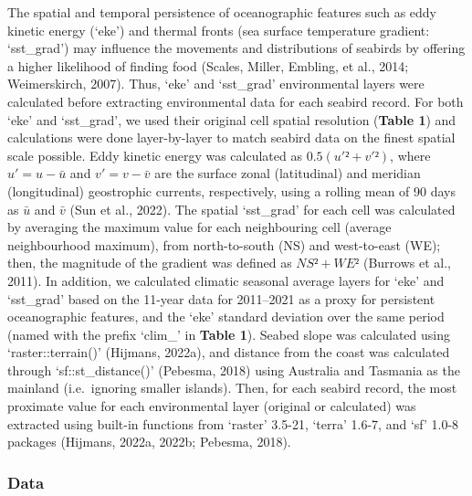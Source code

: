 \documentclass{article}
\begin{document}
The spatial and temporal persistence of oceanographic features such as
eddy kinetic energy (`eke') and thermal fronts (sea surface temperature
gradient: `sst\_grad') may influence the movements and distributions of
seabirds by offering a higher likelihood of finding food (Scales,
Miller, Embling, et al., 2014; Weimerskirch, 2007). Thus, `eke' and
`sst\_grad' environmental layers were calculated before extracting
environmental data for each seabird record. For both `eke' and
`sst\_grad', we used their original cell spatial resolution
(\textbf{Table 1}) and calculations were done layer-by-layer to match
seabird data on the finest spatial scale possible. Eddy kinetic energy
was calculated as \(0.5 (u'² + v'²)\), where \(u' = u - \bar{u}\) and
\(v' = v - \bar{v}\) are the surface zonal (latitudinal) and meridian
(longitudinal) geostrophic currents, respectively, using a rolling mean
of 90 days as \(\bar{u}\) and \(\bar{v}\) (Sun et al., 2022). The
spatial `sst\_grad' for each cell was calculated by averaging the
maximum value for each neighbouring cell (average neighbourhood
maximum), from north-to-south (NS) and west-to-east (WE); then, the
magnitude of the gradient was defined as \(NS² + WE²\) (Burrows et al.,
2011). In addition, we calculated climatic seasonal average layers for
`eke' and `sst\_grad' based on the 11-year data for 2011--2021 as a
proxy for persistent oceanographic features, and the `eke' standard
deviation over the same period (named with the prefix `clim\_' in
\textbf{Table 1}). Seabed slope was calculated using `raster::terrain()'
(Hijmans, 2022a), and distance from the coast was calculated through
`sf::st\_distance()' (Pebesma, 2018) using Australia and Tasmania as the
mainland (i.e.~ignoring smaller islands). Then, for each seabird record,
the most proximate value for each environmental layer (original or
calculated) was extracted using built-in functions from `raster' 3.5-21,
`terra' 1.6-7, and `sf' 1.0-8 packages (Hijmans, 2022a, 2022b; Pebesma,
2018).

\hypertarget{modellingdatasets}{%
\subsubsection{Data}\label{modellingdatasets}}

\label{sec:modellingdatasets}
\end{document}
